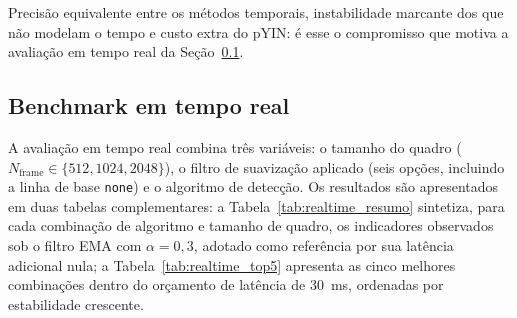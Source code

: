   Precisão equivalente entre os métodos temporais, instabilidade marcante dos
  que não modelam o tempo e custo extra do pYIN: é esse o compromisso que
  motiva a avaliação em tempo real da Seção~\ref{sec:resultados_realtime}.

  \subsection{Benchmark em tempo real}
  \label{sec:resultados_realtime}

  A avaliação em tempo real combina três variáveis: o tamanho do quadro
  ($N_{\text{frame}} \in \{512, 1024, 2048\}$), o filtro de suavização aplicado
  (seis opções, incluindo a linha de base \texttt{none}) e o algoritmo de
  detecção. Os resultados são apresentados em duas tabelas complementares: a
  Tabela~\ref{tab:realtime_resumo} sintetiza, para cada combinação de algoritmo
  e tamanho de quadro, os indicadores observados sob o filtro EMA com
  $\alpha = 0{,}3$, adotado como referência por sua latência adicional nula; a
  Tabela~\ref{tab:realtime_top5} apresenta as cinco melhores combinações dentro
  do orçamento de latência de 30~ms, ordenadas por estabilidade crescente.

